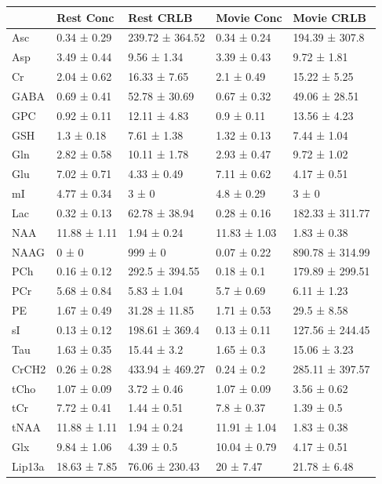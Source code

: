 \documentclass[
true
]{sn-jnl}
\newcounter{none} %
\begin{document}
\begin{supptbl}
{{\def\LTcaptype{none} %
\begin{longtable*}[]{@{}lllll@{}}
\toprule\noalign{}
& Rest Conc & Rest CRLB & Movie Conc & Movie CRLB \\
\midrule\noalign{}
\endhead
\bottomrule\noalign{}
\endlastfoot
Asc & 0.34 ± 0.29 & 239.72 ± 364.52 & 0.34 ± 0.24 & 194.39 ± 307.8 \\
Asp & 3.49 ± 0.44 & 9.56 ± 1.34 & 3.39 ± 0.43 & 9.72 ± 1.81 \\
Cr & 2.04 ± 0.62 & 16.33 ± 7.65 & 2.1 ± 0.49 & 15.22 ± 5.25 \\
GABA & 0.69 ± 0.41 & 52.78 ± 30.69 & 0.67 ± 0.32 & 49.06 ± 28.51 \\
GPC & 0.92 ± 0.11 & 12.11 ± 4.83 & 0.9 ± 0.11 & 13.56 ± 4.23 \\
GSH & 1.3 ± 0.18 & 7.61 ± 1.38 & 1.32 ± 0.13 & 7.44 ± 1.04 \\
Gln & 2.82 ± 0.58 & 10.11 ± 1.78 & 2.93 ± 0.47 & 9.72 ± 1.02 \\
Glu & 7.02 ± 0.71 & 4.33 ± 0.49 & 7.11 ± 0.62 & 4.17 ± 0.51 \\
mI & 4.77 ± 0.34 & 3 ± 0 & 4.8 ± 0.29 & 3 ± 0 \\
Lac & 0.32 ± 0.13 & 62.78 ± 38.94 & 0.28 ± 0.16 & 182.33 ± 311.77 \\
NAA & 11.88 ± 1.11 & 1.94 ± 0.24 & 11.83 ± 1.03 & 1.83 ± 0.38 \\
NAAG & 0 ± 0 & 999 ± 0 & 0.07 ± 0.22 & 890.78 ± 314.99 \\
PCh & 0.16 ± 0.12 & 292.5 ± 394.55 & 0.18 ± 0.1 & 179.89 ± 299.51 \\
PCr & 5.68 ± 0.84 & 5.83 ± 1.04 & 5.7 ± 0.69 & 6.11 ± 1.23 \\
PE & 1.67 ± 0.49 & 31.28 ± 11.85 & 1.71 ± 0.53 & 29.5 ± 8.58 \\
sI & 0.13 ± 0.12 & 198.61 ± 369.4 & 0.13 ± 0.11 & 127.56 ± 244.45 \\
Tau & 1.63 ± 0.35 & 15.44 ± 3.2 & 1.65 ± 0.3 & 15.06 ± 3.23 \\
CrCH2 & 0.26 ± 0.28 & 433.94 ± 469.27 & 0.24 ± 0.2 & 285.11 ± 397.57 \\
tCho & 1.07 ± 0.09 & 3.72 ± 0.46 & 1.07 ± 0.09 & 3.56 ± 0.62 \\
tCr & 7.72 ± 0.41 & 1.44 ± 0.51 & 7.8 ± 0.37 & 1.39 ± 0.5 \\
tNAA & 11.88 ± 1.11 & 1.94 ± 0.24 & 11.91 ± 1.04 & 1.83 ± 0.38 \\
Glx & 9.84 ± 1.06 & 4.39 ± 0.5 & 10.04 ± 0.79 & 4.17 ± 0.51 \\
Lip13a & 18.63 ± 7.85 & 76.06 ± 230.43 & 20 ± 7.47 & 21.78 ± 6.48 \\

\end{longtable*}}}
\end{supptbl}
\end{document}
